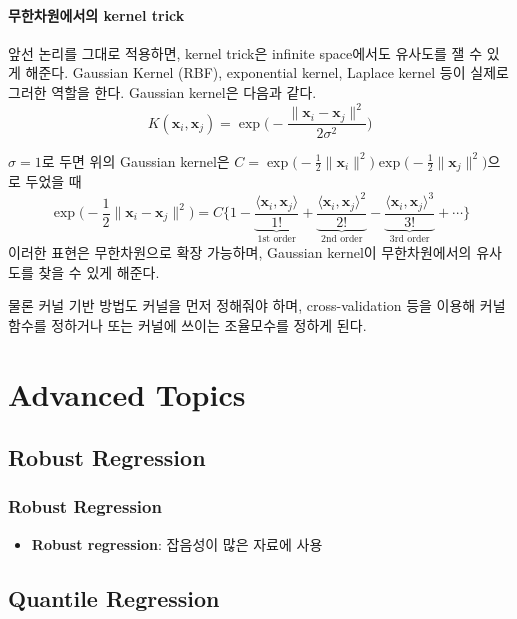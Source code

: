 \documentclass[
  letterpaper,
  DIV=11,
  numbers=noendperiod]{scrreprt}
\providecommand{\tightlist}{%
  \setlength{\itemsep}{0pt}\setlength{\parskip}{0pt}}\usepackage{longtable,booktabs,array}
\theoremstyle{definition}
\theoremstyle{plain}
\theoremstyle{definition}
\theoremstyle{definition}
\theoremstyle{remark}
\begin{document}
\subsection{무한차원에서의 kernel
trick}\label{uxbb34uxd55cuxcc28uxc6d0uxc5d0uxc11cuxc758-kernel-trick}

앞선 논리를 그대로 적용하면, kernel trick은 infinite space에서도
유사도를 잴 수 있게 해준다. Gaussian Kernel (RBF), exponential kernel,
Laplace kernel 등이 실제로 그러한 역할을 한다. Gaussian kernel은 다음과
같다. \[
K(\pmb{x}_i,\pmb{x}_j)=\exp \Big( - \frac{\| \pmb{x}_i - \pmb{x}_j \|^2}{2\sigma^2} \Big)
\]

\(\sigma=1\)로 두면 위의 Gaussian kernel은
\(C=\exp\Big( -\frac{1}{2}\| \pmb{x}_i\|^2 \Big)\exp\Big( -\frac{1}{2}\| \pmb{x}_j\|^2 \Big)\)으로
두었을 때 \[
\exp \Big( -\frac{1}{2}\| \pmb{x}_i - \pmb{x}_j\|^2 \Big) =C\Big\{ 1- \underbrace{\frac{\langle\pmb{x}_i, \pmb{x}_j \rangle}{1!}}_{\text{1st order}}+\underbrace{\frac{\langle\pmb{x}_i, \pmb{x}_j \rangle^2}{2!}}_{\text{2nd order}}-\underbrace{\frac{\langle\pmb{x}_i, \pmb{x}_j \rangle^3}{3!}}_{\text{3rd order}} + \cdots \Big\}
\] 이러한 표현은 무한차원으로 확장 가능하며, Gaussian kernel이
무한차원에서의 유사도를 찾을 수 있게 해준다.

물론 커널 기반 방법도 커널을 먼저 정해줘야 하며, cross-validation 등을
이용해 커널 함수를 정하거나 또는 커널에 쓰이는 조율모수를 정하게 된다.

\part{Advanced Topics}

\chapter{Robust Regression}\label{robust-regression}

\section{Robust Regression}\label{robust-regression-1}

\begin{itemize}
\tightlist
\item
  \textbf{Robust regression}: 잡음성이 많은 자료에 사용
\end{itemize}

\chapter{Quantile Regression}\label{quantile-regression}
\end{document}
